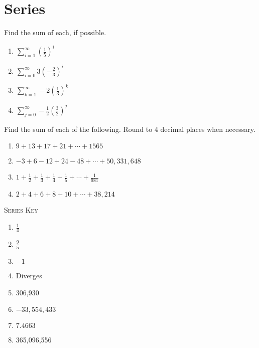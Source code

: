 \chapter{Series}

Find the sum of each, if possible.

\begin{enumerate}
    \item $\sum_{i=1}^{\infty} \left(\frac{1}{5}\right)^i$
    \item $\sum_{i=0}^{\infty} 3\left(-\frac{2}{3}\right)^i$
    \item $\sum_{k=1}^{\infty} -2\left(\frac{1}{3}\right)^k$
    \item $\sum_{j=0}^{\infty} -\frac{1}{2}\left(\frac{3}{2}\right)^j$
\setcounter{Review}{\value{enumi}}
\end{enumerate}

Find the sum of each of the following. Round to 4 decimal places when necessary.
\begin{enumerate}   \setcounter{enumi}{\value{Review}}
    \item $9 + 13 + 17 + 21 + \cdots + 1565$
    \item $-3 + 6 - 12 + 24 - 48 + \cdots + 50,331,648$
    \item $1 + \frac{1}{2} + \frac{1}{3} + \frac{1}{4} + \frac{1}{5} + \cdots + \frac{1}{981}$
    \item $2 + 4 + 6 + 8 + 10 + \cdots + 38,214$
\end{enumerate}	\setcounter{Review}{\value{enumi}}

\newpage

\textsc{Series Key}

\begin{enumerate}
	\item $\frac{1}{4}$
    \item $\frac{9}{5}$
    \item $-1$
    \item Diverges
    \item 306,930
    \item $-33,554,433$
    \item $7.4663$
    \item 365,096,556
\end{enumerate}
